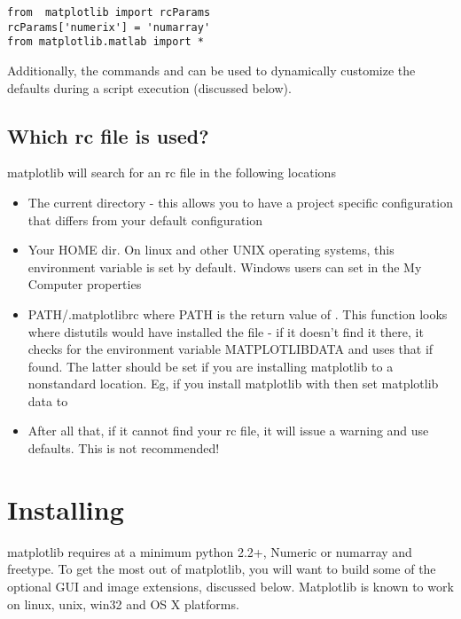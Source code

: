 \documentclass[twoside]{book}
\begin{document}
\begin{lstlisting}
from  matplotlib import rcParams
rcParams['numerix'] = 'numarray'
from matplotlib.matlab import *
\end{lstlisting}

\noindent Additionally, the commands  and
 can be used to dynamically customize
the defaults during a script execution (discussed below).

\subsection{Which rc file is used?}

matplotlib will search for an rc file in the following locations

\begin{itemize}
\item The current directory - this allows you to have a project
  specific configuration that differs from your default configuration

\item Your HOME dir.  On linux and other UNIX operating systems, this
  environment variable is set by default.  Windows users can set in
  the My Computer properties
  
\item PATH/.matplotlibrc where PATH is the return value of
  .  This function looks where
  distutils would have installed the file - if it doesn't find it
  there, it checks for the environment variable MATPLOTLIBDATA and
  uses that if found.  The latter should be set if you are installing
  matplotlib to a nonstandard location.  Eg, if you install matplotlib
  with  then set
  matplotlib data to 

\item After all that, if it cannot find your rc file, it will issue a
  warning and use defaults.  This is not recommended!
\end{itemize}


\section{Installing}
\label{sec:installing}

matplotlib requires at a minimum python 2.2+, Numeric or numarray and
freetype.  To get the most out of matplotlib, you will want to build
some of the optional GUI and image extensions, discussed below.
Matplotlib is known to work on linux, unix, win32 and OS X platforms.
\end{document}

